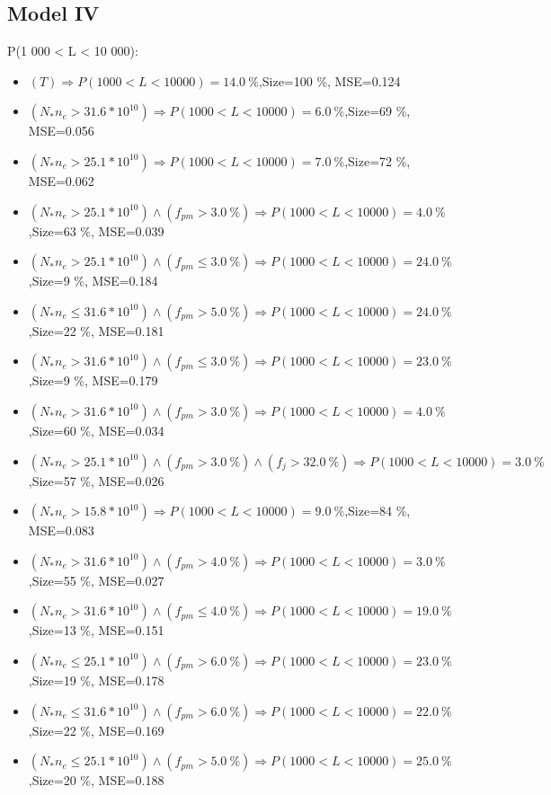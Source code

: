 \documentclass[numbered]{CSL}
\begin{document}
\subsection{Model IV}
P(1 000 < L < 10 000):
\begin{itemize}
\item $(T) \Rightarrow P(1 000 < L < 10 000) = 14.0~\%$,\hfill Size=100 \%, MSE=0.124
\item $(N_* n_e > 31.6 * 10^{10}) \Rightarrow P(1 000 < L < 10 000) = 6.0~\%$,\hfill Size=69 \%, MSE=0.056
\item $(N_* n_e > 25.1 * 10^{10}) \Rightarrow P(1 000 < L < 10 000) = 7.0~\%$,\hfill Size=72 \%, MSE=0.062
\item $(N_* n_e > 25.1 * 10^{10}) \land (f_{pm} > 3.0~\%) \Rightarrow P(1 000 < L < 10 000) = 4.0~\%$,\hfill Size=63 \%, MSE=0.039
\item $(N_* n_e > 25.1 * 10^{10}) \land (f_{pm} \leq 3.0~\%) \Rightarrow P(1 000 < L < 10 000) = 24.0~\%$,\hfill Size=9 \%, MSE=0.184
\item $(N_* n_e \leq 31.6 * 10^{10}) \land (f_{pm} > 5.0~\%) \Rightarrow P(1 000 < L < 10 000) = 24.0~\%$,\hfill Size=22 \%, MSE=0.181
\item $(N_* n_e > 31.6 * 10^{10}) \land (f_{pm} \leq 3.0~\%) \Rightarrow P(1 000 < L < 10 000) = 23.0~\%$,\hfill Size=9 \%, MSE=0.179
\item $(N_* n_e > 31.6 * 10^{10}) \land (f_{pm} > 3.0~\%) \Rightarrow P(1 000 < L < 10 000) = 4.0~\%$,\hfill Size=60 \%, MSE=0.034
\item $(N_* n_e > 25.1 * 10^{10}) \land (f_{pm} > 3.0~\%) \land (f_j > 32.0~\%) \Rightarrow P(1 000 < L < 10 000) = 3.0~\%$,\hfill Size=57 \%, MSE=0.026
\item $(N_* n_e > 15.8 * 10^{10}) \Rightarrow P(1 000 < L < 10 000) = 9.0~\%$,\hfill Size=84 \%, MSE=0.083
\item $(N_* n_e > 31.6 * 10^{10}) \land (f_{pm} > 4.0~\%) \Rightarrow P(1 000 < L < 10 000) = 3.0~\%$,\hfill Size=55 \%, MSE=0.027
\item $(N_* n_e > 31.6 * 10^{10}) \land (f_{pm} \leq 4.0~\%) \Rightarrow P(1 000 < L < 10 000) = 19.0~\%$,\hfill Size=13 \%, MSE=0.151
\item $(N_* n_e \leq 25.1 * 10^{10}) \land (f_{pm} > 6.0~\%) \Rightarrow P(1 000 < L < 10 000) = 23.0~\%$,\hfill Size=19 \%, MSE=0.178
\item $(N_* n_e \leq 31.6 * 10^{10}) \land (f_{pm} > 6.0~\%) \Rightarrow P(1 000 < L < 10 000) = 22.0~\%$,\hfill Size=22 \%, MSE=0.169
\item $(N_* n_e \leq 25.1 * 10^{10}) \land (f_{pm} > 5.0~\%) \Rightarrow P(1 000 < L < 10 000) = 25.0~\%$,\hfill Size=20 \%, MSE=0.188

\end{itemize}
\end{document}
